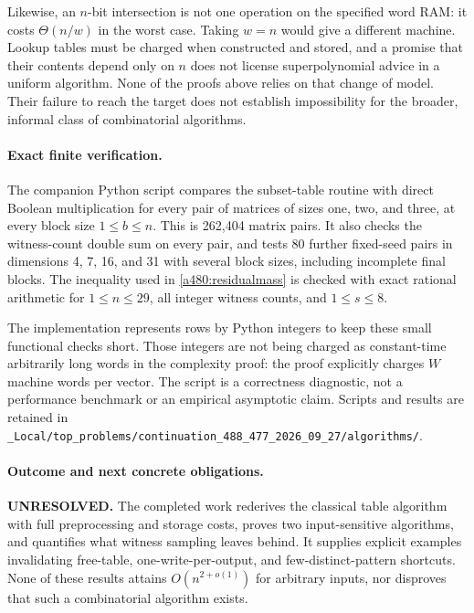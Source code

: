 \documentclass[11pt]{article}
\begin{document}
Likewise, an $n$-bit intersection is not one operation on the specified
word RAM: it costs $\Theta(n/w)$ in the worst case. Taking $w=n$ would
give a different machine. Lookup tables must be charged when constructed
and stored, and a promise that their contents depend only on $n$ does
not license superpolynomial advice in a uniform algorithm. None of the
proofs above relies on that change of model. Their failure to reach the
target does not establish impossibility for the broader, informal class
of combinatorial algorithms.

\paragraph{Exact finite verification.}
The companion Python script compares the subset-table routine with direct
Boolean multiplication for every pair of matrices of sizes one, two, and
three, at every block size $1\leq b\leq n$. This is 262,404 matrix
pairs. It also checks the witness-count double sum on every pair, and
tests 80 further fixed-seed pairs in dimensions 4, 7, 16, and 31 with
several block sizes, including incomplete final blocks. The inequality
used in \eqref{a480:residualmass} is checked with exact rational arithmetic
for $1\leq n\leq29$, all integer witness counts, and $1\leq s\leq8$.

The implementation represents rows by Python integers to keep these small
functional checks short. Those integers are not being charged as
constant-time arbitrarily long words in the complexity proof: the proof
explicitly charges $W$ machine words per vector. The script is a
correctness diagnostic, not a performance benchmark or an empirical
asymptotic claim. Scripts and results are retained in
\nolinkurl{_Local/top_problems/continuation_488_477_2026_09_27/algorithms/}.

\paragraph{Outcome and next concrete obligations.}
\textbf{UNRESOLVED.} The completed work rederives the classical table
algorithm with full preprocessing and storage costs, proves two input-sensitive
algorithms, and quantifies what witness sampling leaves behind. It supplies
explicit examples invalidating free-table, one-write-per-output, and
few-distinct-pattern shortcuts. None of these results attains
$O(n^{2+o(1)})$ for arbitrary inputs, nor disproves that such a
combinatorial algorithm exists.
\end{document}
